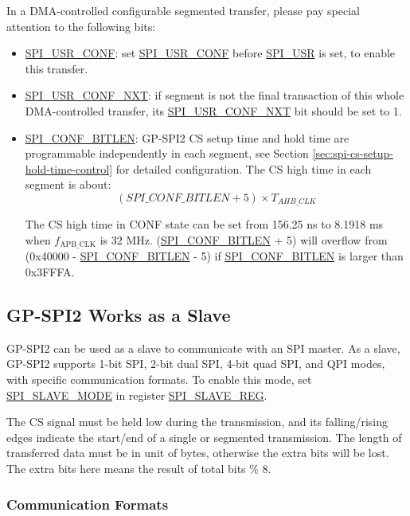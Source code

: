 \documentclass[main\_\_EN.tex]{subfiles}
\begin{document}
In a DMA-controlled configurable segmented transfer, please pay special attention to the following bits:
\begin{itemize}
    \item \hyperref[fielddesc:SPIUSRCONF]{SPI\_USR\_CONF}: set \hyperref[fielddesc:SPIUSRCONF]{SPI\_USR\_CONF} before \hyperref[fielddesc:SPIUSR]{SPI\_USR} is set, to enable this transfer.
    \item \hyperref[fielddesc:SPIUSRCONFNXT]{SPI\_USR\_CONF\_NXT}: if segment is not the final transaction of this whole DMA-controlled transfer, its \hyperref[fielddesc:SPIUSRCONFNXT]{SPI\_USR\_CONF\_NXT} bit should be set to 1.
    \item \hyperref[fielddesc:SPICONFBITLEN]{SPI\_CONF\_BITLEN}: GP-SPI2 CS setup time and hold time are programmable independently in each segment, see Section \ref{sec:spi-cs-setup-hold-time-control} for detailed configuration. The CS high time in each segment is about:
    \[
    (\hyperref[fielddesc:SPICONFBITLEN]{SPI\_CONF\_BITLEN} + 5) \times T_{AHB\_CLK}
    \]

The CS high time in CONF state can be set from 156.25 ns to 8.1918 ms when $f_{\textrm{APB\_CLK}}$ is 32 MHz.
(\hyperref[fielddesc:SPICONFBITLEN]{SPI\_CONF\_BITLEN} + 5) will overflow from (0x40000 - \hyperref[fielddesc:SPICONFBITLEN]{SPI\_CONF\_BITLEN} - 5) if \hyperref[fielddesc:SPICONFBITLEN]{SPI\_CONF\_BITLEN} is larger than 0x3FFFA.
\end{itemize}

\subsection{GP-SPI2 Works as a Slave}\label{sec:spi-slave-mode}

GP-SPI2 can be used as a slave to communicate with an SPI master. As a slave, GP-SPI2 supports 1-bit SPI, 2-bit dual SPI, 4-bit quad SPI, and QPI modes, with specific communication formats. To enable this mode, set \hyperref[fielddesc:SPISLAVEMODE]{SPI\_SLAVE\_MODE} in register \hyperref[regdesc:SPISLAVEREG]{SPI\_SLAVE\_REG}.

The CS signal must be held low during the transmission, and its falling/rising edges indicate the start/end of a single or segmented transmission. The length of transferred data must be in unit of bytes, otherwise the extra bits will be lost. The extra bits here means the result of total bits \% 8.

\subsubsection{Communication Formats}\label{para:spi-slave-comm-format}
\end{document}
